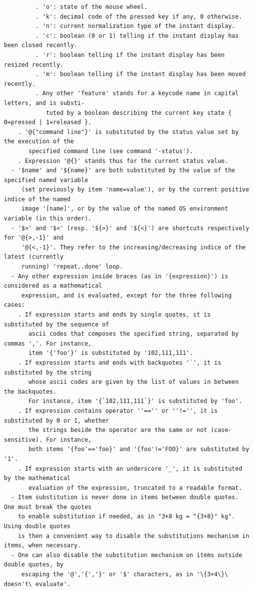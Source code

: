 \documentclass[a4paper,11pt,twoside]{book}
\begin{document}
\begin{lstlisting}
         . 'o': state of the mouse wheel. 
         . 'k': decimal code of the pressed key if any, 0 otherwise. 
         . 'n': current normalization type of the instant display. 
         . 'c': boolean (0 or 1) telling if the instant display has been closed recently. 
         . 'r': boolean telling if the instant display has been resized recently. 
         . 'm': boolean telling if the instant display has been moved recently. 
         . Any other 'feature' stands for a keycode name in capital letters, and is substi- 
            tuted by a boolean describing the current key state { 0=pressed | 1=released }. 
    . '@{"command line"}' is substituted by the status value set by the execution of the 
       specified command line (see command '-status'). 
    . Expression '@{}' stands thus for the current status value. 
  - '$name' and '${name}' are both substituted by the value of the specified named variable 
     (set previously by item 'name=value'), or by the current positive indice of the named 
     image '[name]', or by the value of the named OS environment variable (in this order). 
  - '$>' and '$<' (resp. '${>}' and '${<}') are shortcuts respectively for '@{>,-1}' and 
     '@{<,-1}'. They refer to the increasing/decreasing indice of the latest (currently 
     running) 'repeat..done' loop. 
  - Any other expression inside braces (as in '{expression}') is considered as a mathematical 
     expression, and is evaluated, except for the three following cases: 
    . If expression starts and ends by single quotes, it is substituted by the sequence of 
       ascii codes that composes the specified string, separated by commas ','. For instance, 
       item '{'foo'}' is substituted by '102,111,111'. 
    . If expression starts and ends with backquotes '`', it is substituted by the string 
       whose ascii codes are given by the list of values in between the backquotes. 
       For instance, item '{`102,111,111`}' is substituted by 'foo'. 
    . If expression contains operator ''=='' or ''!='', it is substituted by 0 or 1, whether 
       the strings beside the operator are the same or not (case-sensitive). For instance, 
       both items '{foo'=='foo}' and '{foo'!='FOO}' are substituted by '1'. 
    . If expression starts with an underscore '_', it is substituted by the mathematical 
       evaluation of the expression, truncated to a readable format. 
  - Item substitution is never done in items between double quotes. One must break the quotes 
    to enable substitution if needed, as in "3+8 kg = "{3+8}" kg". Using double quotes 
    is then a convenient way to disable the substitutions mechanism in items, when necessary. 
  - One can also disable the substitution mechanism on items outside double quotes, by 
     escaping the '@','{','}' or '$' characters, as in '\{3+4\}\ doesn't\ evaluate'.
\end{lstlisting}
\normalsize
\end{document}
